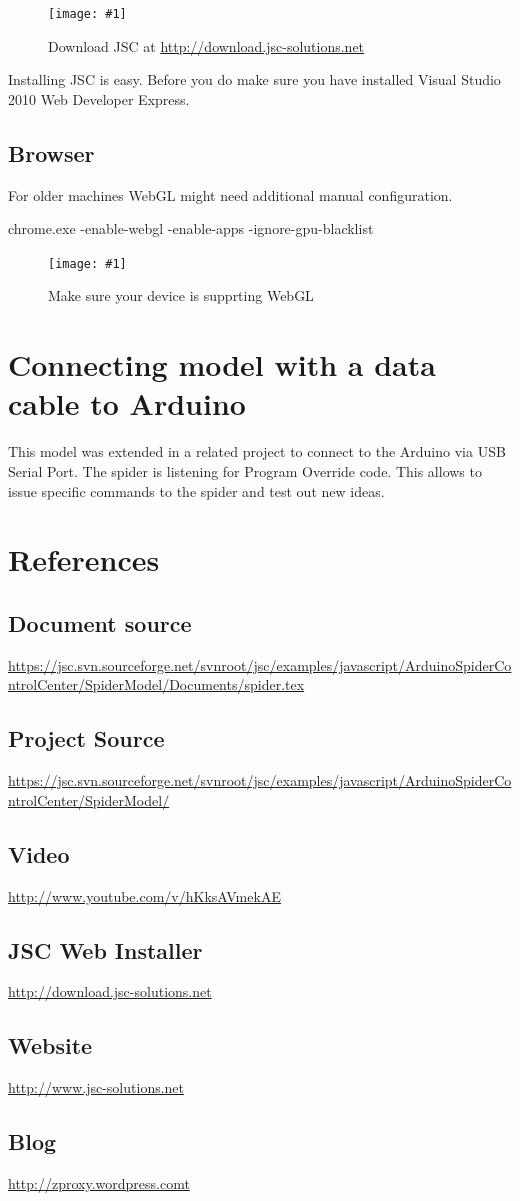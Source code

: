\documentclass[12pt,leqno]{book}
\newcommand{\png}[1]{\texttt{[image: \#1]}}
\newcommand{\figpng}[2]{\begin{figure}[htb]\centering\png{#1}\caption{#2}\end{figure}}
\begin{document}
\figpng{Images/jsc_-_Google_Chrome-2012-03-14_14.33.04}
{Download JSC at \url{http://download.jsc-solutions.net}}

Installing JSC is easy. Before you do make sure you have installed Visual Studio 2010 Web Developer Express.

\section{Browser}

For older machines WebGL might need additional manual configuration.

\begin{framed}
chrome.exe -enable-webgl -enable-apps -ignore-gpu-blacklist
\end{framed}

\figpng{Images/aboutgpu_-_Google_Chrome-2012-03-14_17.56.30}
{Make sure your device is supprting WebGL}

\chapter{Connecting model with a data cable to Arduino}

This model was extended in a related project to connect to the Arduino via USB Serial Port. 
The spider is listening for Program Override code. This allows to issue specific commands to the spider
and test out new ideas.



\chapter{References}

\section{Document source}

\url{https://jsc.svn.sourceforge.net/svnroot/jsc/examples/javascript/ArduinoSpiderControlCenter/SpiderModel/Documents/spider.tex}

\section{Project Source}
\url{https://jsc.svn.sourceforge.net/svnroot/jsc/examples/javascript/ArduinoSpiderControlCenter/SpiderModel/}

\section{Video}
\url{http://www.youtube.com/v/hKksAVmekAE}

\section{JSC Web Installer}
\url{http://download.jsc-solutions.net}

\section{Website}
\url{http://www.jsc-solutions.net}

\section{Blog}
\url{http://zproxy.wordpress.comt}
\end{document}
